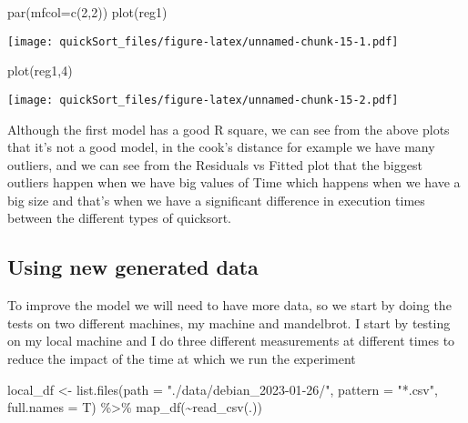 \documentclass[
]{article}
\newenvironment{Shaded}{\begin{snugshade}}{\end{snugshade}}
\newcommand{\AttributeTok}[1]{\textcolor[rgb]{0.77,0.63,0.00}{#1}}
\newcommand{\DecValTok}[1]{\textcolor[rgb]{0.00,0.00,0.81}{#1}}
\newcommand{\FunctionTok}[1]{\textcolor[rgb]{0.00,0.00,0.00}{#1}}
\newcommand{\NormalTok}[1]{#1}
\newcommand{\OtherTok}[1]{\textcolor[rgb]{0.56,0.35,0.01}{#1}}
\newcommand{\SpecialCharTok}[1]{\textcolor[rgb]{0.00,0.00,0.00}{#1}}
\newcommand{\StringTok}[1]{\textcolor[rgb]{0.31,0.60,0.02}{#1}}
\begin{document}
\begin{Shaded}
\begin{Highlighting}[]
\FunctionTok{par}\NormalTok{(}\AttributeTok{mfcol=}\FunctionTok{c}\NormalTok{(}\DecValTok{2}\NormalTok{,}\DecValTok{2}\NormalTok{))}
\FunctionTok{plot}\NormalTok{(reg1)}
\end{Highlighting}
\end{Shaded}

\texttt{[image: quickSort\_files/figure-latex/unnamed-chunk-15-1.pdf]}

\begin{Shaded}
\begin{Highlighting}[]
\FunctionTok{plot}\NormalTok{(reg1,}\DecValTok{4}\NormalTok{)}
\end{Highlighting}
\end{Shaded}

\texttt{[image: quickSort\_files/figure-latex/unnamed-chunk-15-2.pdf]}

Although the first model has a good R square, we can see from the above
plots that it's not a good model, in the cook's distance for example we
have many outliers, and we can see from the Residuals vs Fitted plot
that the biggest outliers happen when we have big values of Time which
happens when we have a big size and that's when we have a significant
difference in execution times between the different types of quicksort.

\hypertarget{using-new-generated-data}{%
\subsection{Using new generated data}\label{using-new-generated-data}}

To improve the model we will need to have more data, so we start by
doing the tests on two different machines, my machine and mandelbrot. I
start by testing on my local machine and I do three different
measurements at different times to reduce the impact of the time at
which we run the experiment

\begin{Shaded}
\begin{Highlighting}[]
\NormalTok{local\_df }\OtherTok{\textless{}{-}} \FunctionTok{list.files}\NormalTok{(}\AttributeTok{path =} \StringTok{"./data/debian\_2023{-}01{-}26/"}\NormalTok{, }\AttributeTok{pattern =} \StringTok{"*.csv"}\NormalTok{, }\AttributeTok{full.names =}\NormalTok{ T) }\SpecialCharTok{\%\textgreater{}\%} \FunctionTok{map\_df}\NormalTok{(}\SpecialCharTok{\textasciitilde{}}\FunctionTok{read\_csv}\NormalTok{(.)) }
\end{Highlighting}
\end{Shaded}
\end{document}
